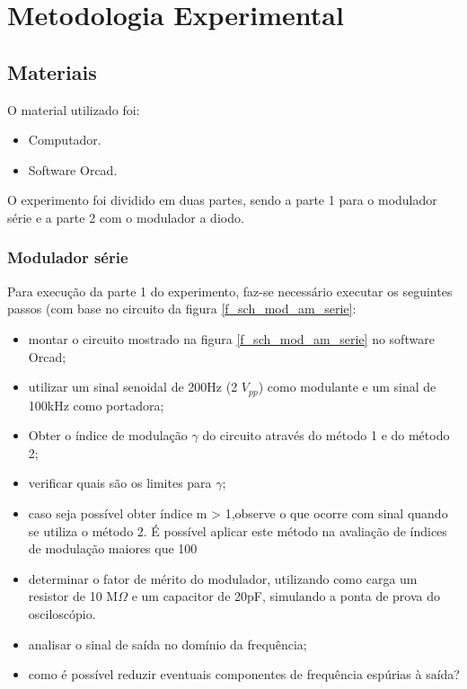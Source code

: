\newpage
\section{Metodologia Experimental}

\subsection{Materiais}
O material utilizado foi:
\begin{itemize}
\item Computador.
\item Software Orcad.

\end{itemize}
O experimento foi dividido em duas partes, sendo a parte 1 para o modulador série e a parte 2 com o modulador a diodo.

\subsubsection{Modulador série}
Para execução da parte 1 do experimento, faz-se necessário executar os seguintes passos (com base no circuito da figura \ref{f_sch_mod_am_serie}:

\begin{itemize}
\item montar o circuito mostrado na figura \ref{f_sch_mod_am_serie} no software Orcad;
\item utilizar um sinal senoidal de 200Hz (2 $V_{pp}$) como modulante e um sinal de 100kHz como portadora;
\item Obter o índice de modulação $\gamma$ do circuito através do método 1 e do método 2;
\item verificar quais são os limites para $\gamma$;
\item caso seja possível obter índice m > 1,observe o que ocorre com sinal quando se utiliza o método 2. É possível aplicar este método na avaliação de índices de modulação maiores que 100%
\item determinar o fator de mérito do modulador, utilizando como carga um resistor de 10 M$\Omega$ e um capacitor de 20pF, simulando a ponta de prova do osciloscópio.
\item analisar o sinal de saída no domínio da frequência;
\item como é possível reduzir eventuais componentes de frequência espúrias à saída?
\end{itemize}

